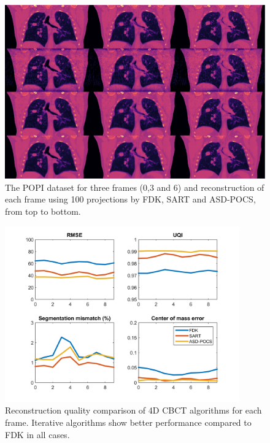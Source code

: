 \begin{figure}
\begin{center}

\includegraphics[width=\textwidth]{accuracyMC/4DCBCT3stage.png} 


\end{center}

\caption[Three frames of the 4D CBCT recosntruction with different algorithm]{\label{fig:4dCBCT3static} The POPI dataset for three frames (0,3 and 6) and reconstruction of each frame using 100 projections by FDK, SART and ASD-POCS, from top to bottom.} 
\end{figure}

\begin{figure}
\begin{center}

\includegraphics[width=0.9\textwidth]{accuracyMC/4DCBCTparams.png} 


\end{center}

\caption[Recustruction quality comparison of 4D CBCT algorithms]{\label{fig:4dCBCTquality} Reconstruction quality comparison of 4D CBCT algorithms for each frame. Iterative algorithms show better performance compared to FDK in all cases.} 
\end{figure}

